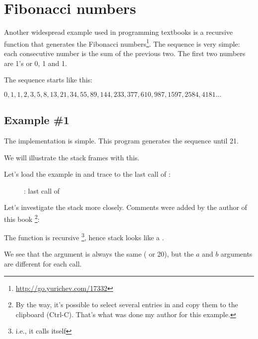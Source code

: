 \section{Fibonacci numbers}

Another widespread example used in programming textbooks is a recursive function 
that generates the Fibonacci numbers\footnote{\url{http://go.yurichev.com/17332}}.
The sequence is very simple: each consecutive number is the sum of the previous two.
The first two numbers are 1's or 0, 1 and 1.

The sequence starts like this:

\begin{center}
$0, 1, 1, 2, 3, 5, 8, 13, 21, 34, 55, 89, 144, 233, 377, 610, 987, 1597, 2584, 4181 ...$
\end{center}

\subsection{Example \#1}

The implementation is simple. This program generates the sequence until 21.





We will illustrate the stack frames with this.

\clearpage

Let's load the example in \olly and trace to the last call of \ttf{}:

\begin{figure}[H]
\centering
{}
\caption{\olly: last call of \ttf{}}
\label{fig:fib_olly}
\end{figure}

\clearpage
Let's investigate the stack more closely. 
Comments were added by the author of this book
\footnote{By the way, it's possible to select several entries in \olly and copy them to the clipboard (Ctrl-C).
That's what was done my author for this example.}:



The function is recursive \footnote{i.e., it calls itself}, hence stack looks like a .

We see that the  argument is always the same ( or 20), but the $a$ and $b$ arguments are different for each call.


